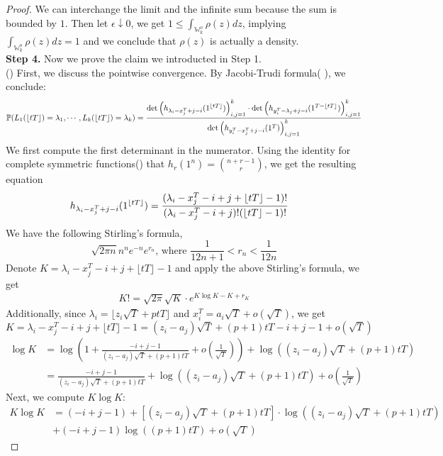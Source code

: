 \begin{proof}
We can interchange the limit and the infinite sum because the sum is bounded by $1$. Then let $\epsilon\downarrow 0$, we get $1\leqslant\int_{\mathbb{W}_{k}^{o}}\rho(z)dz$, implying $\int_{\mathbb{W}_{k}^{o}}\rho(z)dz=1$ and we conclude that $\rho(z)$ is actually a density.\\
\textbf{Step 4. }Now we prove the claim we introducted in Step 1. \\
() First, we discuss the pointwise convergence. By Jacobi-Trudi formula(\cite[Chapter 1, (5.4)]{Mac} ), we conclude:
\begin{align*}
\mathbb{P}(L_1(\lfloor tT\rfloor)=\lambda_1,\cdots, L_k(\lfloor tT\rfloor)=\lambda_k)=\frac{\det\left(h_{\lambda_i-x_j^T+j-i}(1^{\lfloor tT\rfloor})\right)_{i,j=1}^k\cdot\det\left(h_{y_i^T-\lambda_j+j-i}(1^{T-\lfloor tT\rfloor})\right)_{i,j=1}^k}{\det\left(h_{y_i^{T}-x_j^T+j-i}(1^T)\right)_{i,j=1}^k}	
\end{align*}
We first compute the first determinant in the numerator. Using the identity for complete symmetric functions(\cite[Example 1, Section I.2]{Mac}) that $h_r(1^n)=\binom{n+r-1}{r}$, we get the resulting equation 
\begin{align*}
h_{\lambda_i-x_j^T+j-i}(1^{\lfloor tT\rfloor})&=\frac{(\lambda_{i}-x_{j}^{T}-i+j+\lfloor tT \rfloor -1)!}{(\lambda_{i}-x_{j}^{T}-i+j)!(\lfloor tT \rfloor -1)!}
\end{align*}
We have the following Stirling's formula, 
$$\sqrt{2\pi n}n^ne^{-n}e^{r_{n}}\text{, where }\frac{1}{12n+1}<r_{n}<\frac{1}{12n}$$
Denote $K=\lambda_{i}-x_{j}^{T}-i+j+\lfloor tT \rfloor -1$ and apply the above Stirling's formula, we get
\begin{align*}
K!=\sqrt{2\pi}\sqrt{K}\cdot e^{K\log K-K+r_{K}}
\end{align*}
Additionally, since $\lambda_{i}=\lfloor z_{i}\sqrt{T}+ptT\rfloor$ and $x_{i}^{T}= a_{i}\sqrt{T}+o(\sqrt{T})$, we get \[K=\lambda_{i}-x_{j}^{T}-i+j+\lfloor tT \rfloor -1= (z_{i}-a_{j})\sqrt{T} + (p+1)tT-i+j-1+o(\sqrt{T})\]
\begin{align*}
	\log K&=\log\left(1+\frac{-i+j-1}{(z_{i}-a_{j})\sqrt{T}+(p+1)tT}+o(\frac{1}{\sqrt{T}})\right)+\log((z_{i}-a_{j})\sqrt{T}+(p+1)tT)\\
	&=\frac{-i+j-1}{(z_{i}-a_{j})\sqrt{T}+(p+1)tT}+\log((z_{i}-a_{j})\sqrt{T}+(p+1)tT)+o(\frac{1}{\sqrt{T}})
\end{align*}
Next, we compute $K\log K$:
\begin{align*}
K\log K &=\left(-i+j-1\right) + \left[(z_{i}-a_{j})\sqrt{T}+(p+1)tT\right]\cdot \log\left((z_{i}-a_{j})\sqrt{T}+(p+1)tT\right)\\&+(-i+j-1)\log\left((p+1)tT\right)+o(\sqrt{T})

\end{align*}
\end{proof}
